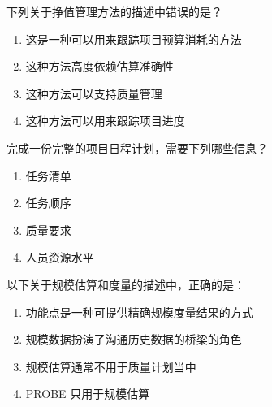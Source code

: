 \begin{problem}
	下列关于挣值管理方法的描述中错误的是？
    \vspace{-0.8em}
    \begin{multicols}{2}
        \begin{enumerate}[label=\Alph*.]
            \item 这是一种可以用来跟踪项目预算消耗的方法
            \item 这种方法高度依赖估算准确性
            \item 这种方法可以支持质量管理
            \item 这种方法可以用来跟踪项目进度
        \end{enumerate}
    \end{multicols}
    \vspace{-1em}
\end{problem}



\begin{problem}
	完成一份完整的项目日程计划，需要下列哪些信息？
    \vspace{-0.8em}
    \begin{multicols}{4}
        \begin{enumerate}[label=\Alph*.]
            \item 任务清单
            \item 任务顺序
            \item 质量要求
            \item 人员资源水平
        \end{enumerate}
    \end{multicols}
    \vspace{-1em}
\end{problem}




\begin{problem}
	以下关于规模估算和度量的描述中，正确的是：
    \vspace{-0.8em}
    \begin{multicols}{2}
        \begin{enumerate}[label=\Alph*.]
            \item 功能点是一种可提供精确规模度量结果的方式
            \item 规模数据扮演了沟通历史数据的桥梁的角色
            \item 规模估算通常不用于质量计划当中
            \item PROBE 只用于规模估算
        \end{enumerate}
    \end{multicols}
    \vspace{-1em}
\end{problem}



